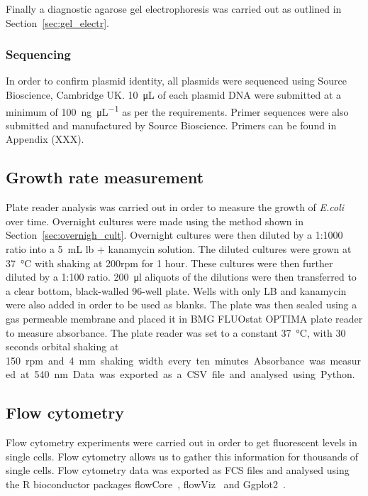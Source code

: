 Finally a diagnostic agarose gel electrophoresis was carried out as outlined in Section~\ref{sec:gel_electr}.

\subsubsection{Sequencing}
In order to confirm plasmid identity, all plasmids were sequenced using Source Bioscience, Cambridge UK. \SI{10}{\micro\liter}  of each plasmid DNA were submitted at a minimum of \SI{100}{\nano\gram\per\micro\liter} as per the requirements. Primer sequences were also submitted and manufactured by Source Bioscience. Primers can be found in Appendix (XXX). 

\subsection{Growth rate measurement}
\label{sec:growth_meth}
Plate reader analysis was carried out in order to measure the growth of \textit{E.coli} over time. Overnight cultures were made using the method shown in Section~\ref{sec:overnigh_cult}. Overnight cultures were then diluted by a 1:1000 ratio into a \SI{5}{\milli\liter} \acrshort{lb} + kanamycin solution. The diluted cultures were grown at \SI{37}{\celsius} with shaking at 200rpm for 1 hour. These cultures were then further diluted by a 1:100 ratio. \SI{200}{\ul} aliquots of the dilutions were then transferred to a clear bottom, black-walled 96-well plate. Wells with only LB and kanamycin were also added in order to be used as blanks. The plate was then sealed using a gas permeable membrane and placed it in BMG FLUOstat OPTIMA plate reader to measure absorbance. The plate reader was set to a constant \SI{37}{\celsius}, with 30 seconds orbital shaking at \SI{150}rpm and \SI{4}{\milli\metre} shaking width every ten minutes. Absorbance was measured at \SI{540}{\nano\meter}. Data was exported as a CSV file and analysed using Python. 

\subsection{Flow cytometry}
Flow cytometry experiments were carried out in order to get fluorescent levels in single cells. Flow cytometry allows us to gather this information for thousands of single cells. Flow cytometry data was exported as FCS files and analysed using the R bioconductor packages flowCore~\autocite{flowCore:man}, flowViz~\autocite{flowViz:man} and Ggplot2~\autocite{ggplot2:bk}. 

